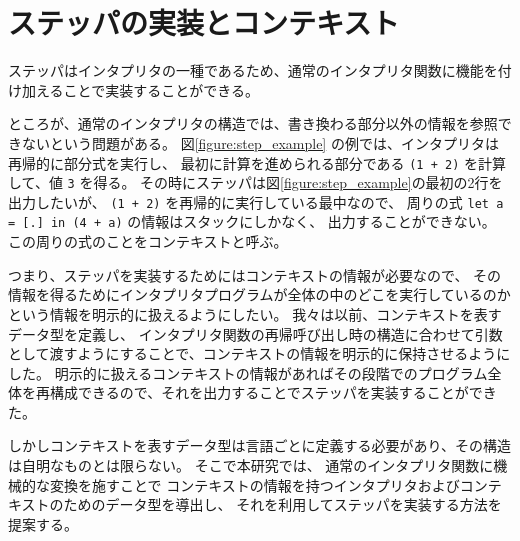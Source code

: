 \section{ステッパの実装とコンテキスト}
\label{section:context}

ステッパはインタプリタの一種であるため、通常のインタプリタ関数に機能を付け加えることで実装することができる。

ところが、通常のインタプリタの構造では、書き換わる部分以外の情報を参照できないという問題がある。
図\ref{figure:step_example} の例では、インタプリタは再帰的に部分式を実行し、
最初に計算を進められる部分である \texttt{(1 + 2)} を計算して、値 \texttt{3} を得る。
その時にステッパは図\ref{figure:step_example}の最初の2行を出力したいが、
\texttt{(1 + 2)} を再帰的に実行している最中なので、
周りの式 \texttt{let a = [.] in (4 + a)} の情報はスタックにしかなく、
出力することができない。
この周りの式のことをコンテキストと呼ぶ。

つまり、ステッパを実装するためにはコンテキストの情報が必要なので、
その情報を得るためにインタプリタプログラムが全体の中のどこを実行しているのかという情報を明示的に扱えるようにしたい。
我々は以前\cite{FCA19}、コンテキストを表すデータ型を定義し、
インタプリタ関数の再帰呼び出し時の構造に合わせて引数として渡すようにすることで、コンテキストの情報を明示的に保持させるようにした。
明示的に扱えるコンテキストの情報があればその段階でのプログラム全体を再構成できるので、それを出力することでステッパを実装することができた。

しかしコンテキストを表すデータ型は言語ごとに定義する必要があり、その構造は自明なものとは限らない。
そこで本研究では、
通常のインタプリタ関数に機械的な変換を施すことで
コンテキストの情報を持つインタプリタおよびコンテキストのためのデータ型を導出し、
それを利用してステッパを実装する方法を提案する。

